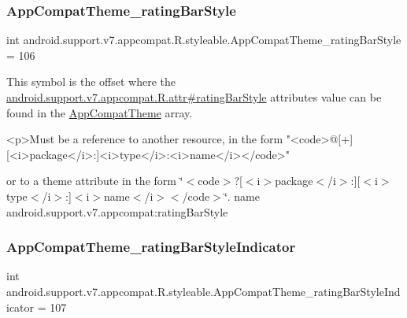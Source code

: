\subsubsection{\texorpdfstring{App\+Compat\+Theme\+\_\+rating\+Bar\+Style}{AppCompatTheme\_ratingBarStyle}}
{\footnotesize\ttfamily int android.\+support.\+v7.\+appcompat.\+R.\+styleable.\+App\+Compat\+Theme\+\_\+rating\+Bar\+Style = 106\hspace{0.3cm}{\ttfamily [static]}}

This symbol is the offset where the \hyperlink{classandroid_1_1support_1_1v7_1_1appcompat_1_1R_1_1attr_ad8092b6dfc3e1e74cfb135768ce06f81}{android.\+support.\+v7.\+appcompat.\+R.\+attr\#rating\+Bar\+Style} attribute\textquotesingle{}s value can be found in the \hyperlink{classandroid_1_1support_1_1v7_1_1appcompat_1_1R_1_1styleable_a5c42f89e8a410c323be34208d75c430b}{App\+Compat\+Theme} array.

\begin{DoxyVerb}      <p>Must be a reference to another resource, in the form "<code>@[+][<i>package</i>:]<i>type</i>:<i>name</i></code>"
\end{DoxyVerb}
 or to a theme attribute in the form \char`\"{}$<$code$>$?\mbox{[}$<$i$>$package$<$/i$>$\+:\mbox{]}\mbox{[}$<$i$>$type$<$/i$>$\+:\mbox{]}$<$i$>$name$<$/i$>$$<$/code$>$\char`\"{}.  name android.\+support.\+v7.\+appcompat\+:rating\+Bar\+Style \mbox{\label{classandroid_1_1support_1_1v7_1_1appcompat_1_1R_1_1styleable_a41bbe74341c8a14fa0aee8d6ae300f08}} 
\subsubsection{\texorpdfstring{App\+Compat\+Theme\+\_\+rating\+Bar\+Style\+Indicator}{AppCompatTheme\_ratingBarStyleIndicator}}
{\footnotesize\ttfamily int android.\+support.\+v7.\+appcompat.\+R.\+styleable.\+App\+Compat\+Theme\+\_\+rating\+Bar\+Style\+Indicator = 107\hspace{0.3cm}{\ttfamily [static]}}

